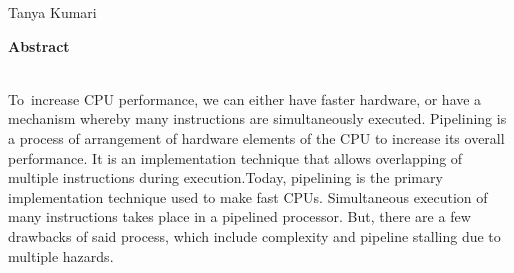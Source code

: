 \documentclass[12pt]{article}
\begin{document}
{\fontsize{18pt}{21.6pt}\selectfont Tanya Kumari\par}\par


\vspace{\baselineskip}

\vspace{\baselineskip}

\vspace{\baselineskip}

\vspace{\baselineskip}

\vspace{\baselineskip}
\vspace{\baselineskip}
\vspace{\baselineskip}
\vspace{\baselineskip}
\vspace{\baselineskip}
\vspace{\baselineskip}\vspace{\baselineskip}\vspace{\baselineskip}\vspace{\baselineskip}\vspace{\baselineskip}\vspace{\baselineskip}\vspace{\baselineskip}\vspace{\baselineskip}\vspace{\baselineskip}\vspace{\baselineskip}\vspace{\baselineskip}\vspace{\baselineskip}\vspace{\baselineskip}


\vspace{\baselineskip}
{\fontsize{22pt}{26.4pt}\selectfont \textbf{Abstract}\par}\par
\vspace{\baselineskip}
{\fontsize{18pt}{21.6pt}\selectfont \\
To\ increase CPU performance, we can either have faster hardware, or have a mechanism whereby many instructions are simultaneously executed. Pipelining is a process of arrangement of hardware elements of the CPU to increase its overall performance. It is an implementation technique that allows overlapping of multiple instructions  during execution.Today, pipelining is the primary implementation technique used to make fast CPUs. Simultaneous execution of many instructions takes place in a pipelined processor. But, there are a few drawbacks of said process, which include complexity and pipeline stalling due to multiple hazards. \par}\par
\end{document}

